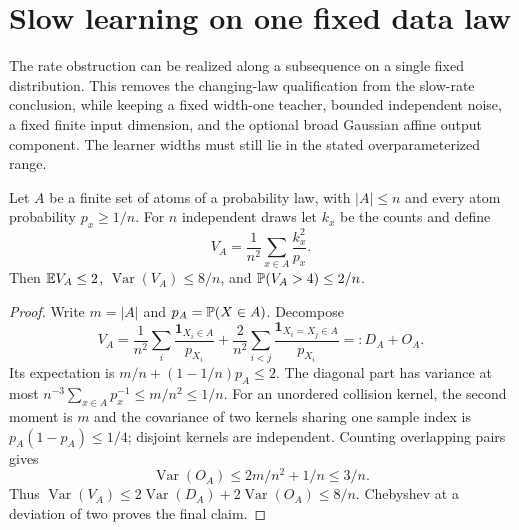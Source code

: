 \section{Slow learning on one fixed data law}
\label{sec:fixed-law-rate}
The rate obstruction can be realized along a subsequence on a single fixed distribution. This removes the changing-law qualification from the slow-rate conclusion, while keeping a fixed width-one teacher, bounded independent noise, a fixed finite input dimension, and the optional broad Gaussian affine output component. The learner widths must still lie in the stated overparameterized range.

\begin{lemma}
\label{lem:weighted-occupancy}
Let $A$ be a finite set of atoms of a probability law, with $|A|\le n$ and every atom probability $p_x\ge1/n$. For $n$ independent draws let $k_x$ be the counts and define
\[
 V_A=\frac1{n^2}\sum_{x\in A}\frac{k_x^2}{p_x}.
\]
Then $\mathbb E V_A\le2$, $\operatorname{Var}(V_A)\le8/n$, and
$\mathbb P(V_A>4)\le2/n$.
\end{lemma}
\begin{proof}
Write $m=|A|$ and $p_A=\mathbb P(X\in A)$. Decompose
\[
 V_A=\frac1{n^2}\sum_i\frac{\mathbf1_{X_i\in A}}{p_{X_i}}
     +\frac2{n^2}\sum_{i<j}\frac{\mathbf1_{X_i=X_j\in A}}{p_{X_i}}
     =:D_A+O_A.
\]
Its expectation is $m/n+(1-1/n)p_A\le2$. The diagonal part has variance at most
$n^{-3}\sum_{x\in A}p_x^{-1}\le m/n^2\le1/n$.
For an unordered collision kernel, the second moment is $m$ and the covariance of two kernels sharing one sample index is $p_A(1-p_A)\le1/4$; disjoint kernels are independent. Counting overlapping pairs gives
\[
 \operatorname{Var}(O_A)\le2m/n^2+1/n\le3/n.
\]
Thus $\operatorname{Var}(V_A)\le2\operatorname{Var}(D_A)+2\operatorname{Var}(O_A)\le8/n$. Chebyshev at a deviation of two proves the final claim.
\end{proof}

